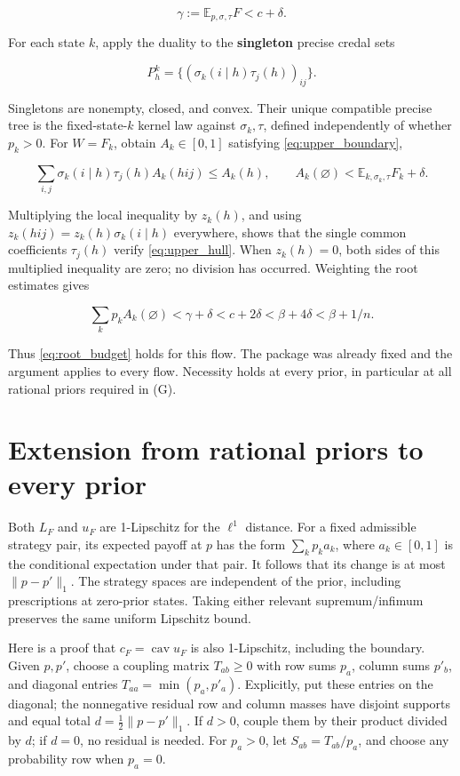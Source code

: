 \documentclass[11pt,a4paper]{article}
\begin{document}
\begin{equation}
\gamma:=\mathbb E_{p,\sigma,\tau}F<c+\delta. \label{eq:tailored_response}
\end{equation}

For each state \(k\), apply the duality to the \textbf{singleton} precise credal sets

\[
P^{k}_h=\{(\sigma_k(i\mid h)\tau_j(h))_{ij}\}.
\]

Singletons are nonempty, closed, and convex. Their unique compatible precise tree is the fixed-state-\(k\) kernel law against \(\sigma_k,\tau\), defined independently of whether \(p_k>0\). For \(W=F_k\), obtain \(A_k\in[0,1]\) satisfying \eqref{eq:upper_boundary},

\begin{equation}
\sum_{i,j}\sigma_k(i\mid h)\tau_j(h)A_k(hij)\le A_k(h),
\qquad
A_k(\varnothing)<\mathbb E_{k,\sigma_k,\tau}F_k+\delta.
\label{eq:precise_hedge}
\end{equation}

Multiplying the local inequality by \(z_k(h)\), and using \(z_k(hij)=z_k(h)\sigma_k(i\mid h)\) everywhere, shows that the single common coefficients \(\tau_j(h)\) verify \eqref{eq:upper_hull}. When \(z_k(h)=0\), both sides of this multiplied inequality are zero; no division has occurred. Weighting the root estimates gives

\[
\sum_kp_kA_k(\varnothing)<\gamma+\delta<c+2\delta
<\beta+4\delta<\beta+1/n.
\]

Thus \eqref{eq:root_budget} holds for this flow. The package was already fixed and the argument applies to every flow. Necessity holds at every prior, in particular at all rational priors required in (G).

\section{Extension from rational priors to every prior}

Both \(L_F\) and \(u_F\) are 1-Lipschitz for the \(\ell^1\) distance. For a fixed admissible strategy pair, its expected payoff at \(p\) has the form \(\sum_kp_ka_k\), where \(a_k\in[0,1]\) is the conditional expectation under that pair. It follows that its change is at most \(\|p-p'\|_1\). The strategy spaces are independent of the prior, including prescriptions at zero-prior states. Taking either relevant supremum/infimum preserves the same uniform Lipschitz bound.

Here is a proof that \(c_F=\operatorname{cav}u_F\) is also 1-Lipschitz, including the boundary. Given \(p,p'\), choose a coupling matrix \(T_{ab}\ge0\) with row sums \(p_a\), column sums \(p'_b\), and diagonal entries \(T_{aa}=\min(p_a,p'_a)\). Explicitly, put these entries on the diagonal; the nonnegative residual row and column masses have disjoint supports and equal total \(d=\tfrac12\|p-p'\|_1\). If \(d>0\), couple them by their product divided by \(d\); if \(d=0\), no residual is needed. For \(p_a>0\), let \(S_{ab}=T_{ab}/p_a\), and choose any probability row when \(p_a=0\).
\end{document}
